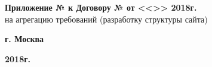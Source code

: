\documentclass[a4paper, fontsize=12bp]{article}
\begin{document}
\begin{center}
\textbf{Приложение № \underline{\hspace{0.05\textwidth}} к Договору № \underline{\hspace{0.1\textwidth}} от <<\underline{\hspace{0.05\textwidth}}>> \underline{\hspace{0.15\textwidth}} 2018г.}\\
на агрегацию требований (разработку структуры сайта)
\end{center}
\noindent
\begin{minipage}{0.5\textwidth}
\begin{flushleft}
\textbf{г. Москва}
\end{flushleft}
\end{minipage}
\begin{minipage}{0.5\textwidth}
\begin{flushright}
\textbf{\underline{\hspace{0.4\textwidth}} 2018г.}
\end{flushright}
\end{minipage}
\end{document}
